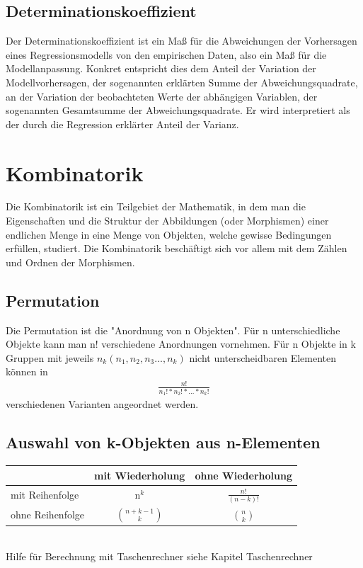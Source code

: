 \documentclass[a4paper,10pt]{scrartcl}
\begin{document}
\subsection{Determinationskoeffizient}
Der Determinationskoeffizient ist ein Maß für die Abweichungen der Vorhersagen eines Regressionsmodells von den empirischen Daten, also ein Maß für die Modellanpassung. Konkret entspricht dies dem Anteil der Variation der Modellvorhersagen, der sogenannten erklärten Summe der Abweichungsquadrate, an der Variation der beobachteten Werte der abhängigen Variablen, der sogenannten Gesamtsumme der Abweichungsquadrate. Er wird interpretiert als der durch die Regression erklärter Anteil der Varianz.
\newpage
\section{Kombinatorik}
Die Kombinatorik ist ein Teilgebiet der Mathematik, in dem man die Eigenschaften und die Struktur der Abbildungen (oder Morphismen) einer endlichen Menge in eine Menge von Objekten, welche gewisse Bedingungen erfüllen, studiert. Die Kombinatorik beschäftigt sich vor allem mit dem Zählen und Ordnen der Morphismen.
\subsection{Permutation}
Die Permutation ist die "Anordnung von n Objekten". Für n unterschiedliche Objekte kann man n! verschiedene Anordnungen vornehmen.\newline
Für n Objekte in k Gruppen mit jeweils
$n_k (n_1,n_2,n_3...,n_k)$ 
nicht unterscheidbaren Elementen können in
\begin{eqnarray*}
\frac{n!}{n_1!*n_2!*...*n_k!}
\end{eqnarray*}
verschiedenen Varianten angeordnet werden.
\subsection{Auswahl von k-Objekten aus n-Elementen}
\begin{tabular}{|l|c|c|} \hline
 & mit Wiederholung & ohne Wiederholung \\\hline
mit Reihenfolge & n$^{k}$ & $\frac{n!}{(n-k)!}$ \\\hline
ohne Reihenfolge & $\binom{n+k-1}{k}$ & $\binom{n}{k}$  \\\hline
\end{tabular}\\
Hilfe für Berechnung mit Taschenrechner siehe Kapitel Taschenrechner
\end{document}
